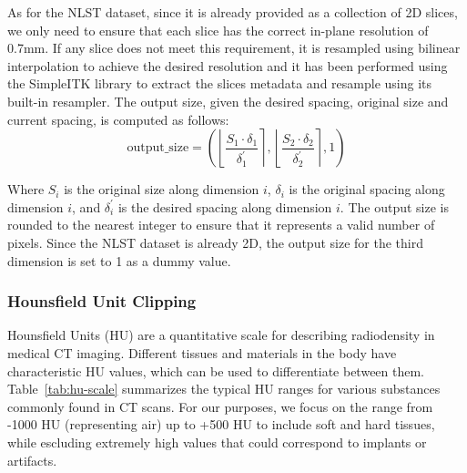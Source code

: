 As for the NLST dataset, since it is already provided as a collection of 2D slices, we only need to ensure that each slice has the correct in-plane resolution of 0.7mm. If any slice does not meet this requirement, it is resampled using bilinear interpolation to achieve the desired resolution and it has been performed using the SimpleITK library \cite{lowekamp2013simpleitk} to extract the slices metadata and resample using its built-in resampler. The output size, given the desired spacing, original size and current spacing, is computed as follows:
$$
\text{output\_size} = \left( \left\lfloor\frac{S_1 \cdot \delta_1}{\delta_1^\prime}\right\rceil, \left\lfloor\frac{S_2 \cdot \delta_2}{\delta_2^\prime}\right\rceil, 1 \right)
$$

Where \(S_i\) is the original size along dimension \(i\), \(\delta_i\) is the original spacing along dimension \(i\), and \(\delta_i^\prime\) is the desired spacing along dimension \(i\). The output size is rounded to the nearest integer to ensure that it represents a valid number of pixels. Since the NLST dataset is already 2D, the output size for the third dimension is set to 1 as a dummy value.

\subsubsection{Hounsfield Unit Clipping}
\label{sec:hu-clipping}
Hounsfield Units (HU) are a quantitative scale for describing radiodensity in medical CT imaging. Different tissues and materials in the body have characteristic HU values, which can be used to differentiate between them. Table~\ref{tab:hu-scale} summarizes the typical HU ranges for various substances commonly found in CT scans. For our purposes, we focus on the range from -1000 HU (representing air) up to +500 HU to include soft and hard tissues, while escluding extremely high values that could correspond to implants or artifacts.



